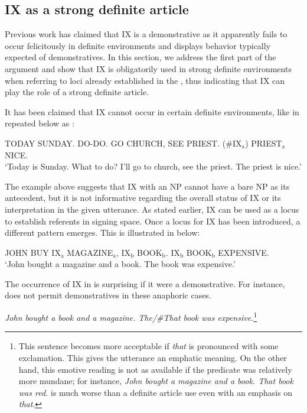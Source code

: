 \documentclass[output=paper,
modfonts
]{langscibook}
\begin{document}
\subsection{IX as a strong definite article}

Previous work \citep{KoulidobrovaLilloMartin2016} has claimed that IX is a demonstrative as it apparently fails to occur felicitously in definite environments and displays behavior typically expected of demonstratives. In this section, we address the first part of the argument and show that IX is obligatorily used in strong definite environments when referring to loci already established in the , thus indicating that IX can play the role of a strong definite article. 

It has been claimed that IX cannot occur in certain definite environments, like in  repeated below as :

\begin{exe} 
\ex \label{ex:irani:20} TODAY SUNDAY. DO-DO. GO CHURCH, SEE PRIEST. (\#IX$_\text{a}$) PRIEST$_\text{a}$ NICE. \\
`Today is Sunday. What to do? I’ll go to church, see the priest. The priest is nice.’ \citep[adapted from][12]{KoulidobrovaLilloMartin2016}
\end{exe} 

The example above suggests that IX with an NP cannot have a bare NP as its antecedent, but it is not informative regarding the overall status of IX or its interpretation in the given utterance. As stated earlier, IX can be used as a locus to establish referents in signing space. Once a locus for IX has been introduced, a different pattern emerges. This is illustrated in  below: 

\begin{exe}
\ex \label{ex:irani:21} JOHN BUY IX$_\text{a}$ MAGAZINE$_\text{a}$, IX$_\text{b}$ BOOK$_\text{b}$. IX$_\text{b}$ BOOK$_\text{b}$ EXPENSIVE.\\
`John bought a magazine and a book. The book was expensive.'
\end{exe}

The occurrence of IX in  is surprising if it were a demonstrative. For instance,  does not permit demonstratives in these anaphoric cases.

\begin{exe}
\ex\label{ex:irani:22} \textit{John bought a book and a magazine. The\textnormal{/}\textnormal{\#}That book was expensive.}\footnote{This sentence becomes more acceptable if \textit{that} is pronounced with some exclamation. This gives the utterance an emphatic meaning. On the other hand, this emotive reading is not as available if the predicate was relatively more mundane; for instance, \textit{John bought a magazine and a book. That book was red.} is much worse than a definite article use even with an emphasis on \textit{that}.}
\end{exe} 
\end{document}
